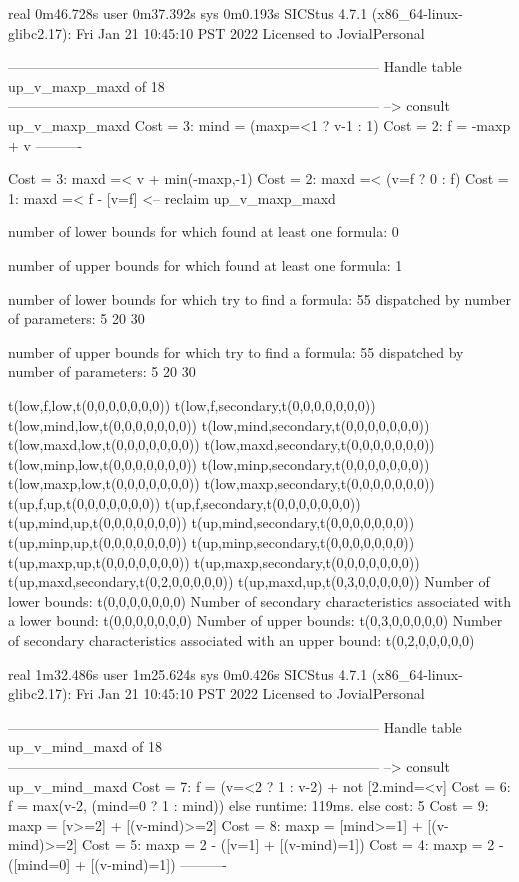 real	0m46.728s
user	0m37.392s
sys	0m0.193s
SICStus 4.7.1 (x86_64-linux-glibc2.17): Fri Jan 21 10:45:10 PST 2022
Licensed to JovialPersonal


--------------------------------------------------------------------------------
Handle table up_v_maxp_maxd of 18
--------------------------------------------------------------------------------
--> consult up_v_maxp_maxd
Cost =  3:  mind = (maxp=<1 ? v-1 : 1)
Cost =  2:  f    = -maxp + v
----------

Cost =  3:  maxd =< v + min(-maxp,-1) %
Cost =  2:  maxd =< (v=f ? 0 : f)
Cost =  1:  maxd =< f - [v=f] %
<-- reclaim up_v_maxp_maxd

number of lower bounds for which found at least one formula: 0

number of upper bounds for which found at least one formula: 1

number of lower bounds for which try to find a formula: 55
dispatched by number of parameters: 5  20  30

number of upper bounds for which try to find a formula: 55
dispatched by number of parameters: 5  20  30

t(low,f,low,t(0,0,0,0,0,0,0))
t(low,f,secondary,t(0,0,0,0,0,0,0))
t(low,mind,low,t(0,0,0,0,0,0,0))
t(low,mind,secondary,t(0,0,0,0,0,0,0))
t(low,maxd,low,t(0,0,0,0,0,0,0))
t(low,maxd,secondary,t(0,0,0,0,0,0,0))
t(low,minp,low,t(0,0,0,0,0,0,0))
t(low,minp,secondary,t(0,0,0,0,0,0,0))
t(low,maxp,low,t(0,0,0,0,0,0,0))
t(low,maxp,secondary,t(0,0,0,0,0,0,0))
t(up,f,up,t(0,0,0,0,0,0,0))
t(up,f,secondary,t(0,0,0,0,0,0,0))
t(up,mind,up,t(0,0,0,0,0,0,0))
t(up,mind,secondary,t(0,0,0,0,0,0,0))
t(up,minp,up,t(0,0,0,0,0,0,0))
t(up,minp,secondary,t(0,0,0,0,0,0,0))
t(up,maxp,up,t(0,0,0,0,0,0,0))
t(up,maxp,secondary,t(0,0,0,0,0,0,0))
t(up,maxd,secondary,t(0,2,0,0,0,0,0))
t(up,maxd,up,t(0,3,0,0,0,0,0))
Number of lower bounds:                                             t(0,0,0,0,0,0,0)
Number of secondary characteristics associated with a lower bound:  t(0,0,0,0,0,0,0)
Number of upper bounds:                                             t(0,3,0,0,0,0,0)
Number of secondary characteristics associated with an upper bound: t(0,2,0,0,0,0,0)

real	1m32.486s
user	1m25.624s
sys	0m0.426s
SICStus 4.7.1 (x86_64-linux-glibc2.17): Fri Jan 21 10:45:10 PST 2022
Licensed to JovialPersonal


--------------------------------------------------------------------------------
Handle table up_v_mind_maxd of 18
--------------------------------------------------------------------------------
--> consult up_v_mind_maxd
Cost =  7:  f    = (v=<2 ? 1 : v-2) + not [2.mind=<v] %
Cost =  6:  f    = max(v-2, (mind=0 ? 1 : mind)) %
else runtime: 119ms. else cost: 5
Cost =  9:  maxp = [v>=2] + [(v-mind)>=2]
Cost =  8:  maxp = [mind>=1] + [(v-mind)>=2]
Cost =  5:  maxp = 2 - ([v=1] + [(v-mind)=1])
Cost =  4:  maxp = 2 - ([mind=0] + [(v-mind)=1])
----------


